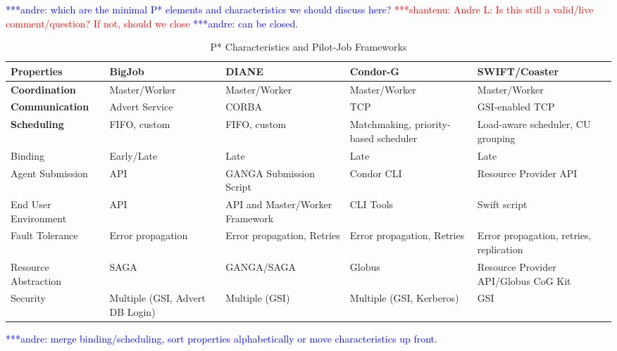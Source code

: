 \documentclass[conference,final]{IEEEtran}
\newcommand{\jhanote}[1]{ {\textcolor{red} { ***shantenu: #1 }}}
\newcommand{\alnote}[1]{ {\textcolor{blue} { ***andre: #1 }}}
\newcommand{\alnote}[1]{}
\newcommand{\jhanote}[1]{}
\newcommand{\cu}{CU\xspace}
\newcommand{\upp}{\vspace*{-0.5em}}
\begin{document}
\alnote{which are the minimal P* elements and characteristics we
  should discuss here?}  \jhanote{Andre L: Is this still a valid/live
  comment/question? If not, should we close}\alnote{can be closed.}

\begin{table}[t]
\centering
\begin{tabular}{|l|p{2.5cm}|p{2.5cm}|p{2.5cm}|p{2.5cm}|}
	\hline
	\textbf{Properties}
	&\textbf{BigJob} &\textbf{DIANE} &\textbf{Condor-G} &   
	\textbf{SWIFT/Coaster} \\ \hline

\textbf{Coordination} &Master/Worker  &Master/Worker  &Master/Worker &Master/Worker \\ \hline
	
\textbf{Communication} &Advert Service &CORBA &TCP &GSI-enabled TCP \\ \hline

\textbf{Scheduling} &FIFO, custom &FIFO, custom &Matchmaking, priority-based scheduler 
&Load-aware scheduler, \cu  grouping\\

\hfill Binding &\hfill Early/Late &\hfill Late &\hfill Late &\hfill Late\\


\hline
Agent Submission &API &GANGA Submission Script &Condor CLI 
&Resource Provider API\\

\hline

End User Environment &API &API and Master/Worker Framework &CLI Tools &Swift 
script\\ 

\hline

Fault Tolerance &Error propagation &Error propagation, Retries &Error propagation, Retries &Error propagation, retries, replication\\

\hline

Resource Abstraction &SAGA &GANGA/SAGA &Globus &Resource Provider API/Globus CoG 
Kit \\ 

\hline

Security &Multiple (GSI, Advert DB Login) &Multiple (GSI) &Multiple (GSI, 
Kerberos) &GSI\\ 

\hline


	
\end{tabular}
\caption{P* Characteristics and Pilot-Job Frameworks\upp\upp}
\label{table:pilot-job-comparison}\alnote{merge binding/scheduling, sort 
properties alphabetically or move characteristics up front.}
\end{table}
\end{document}
